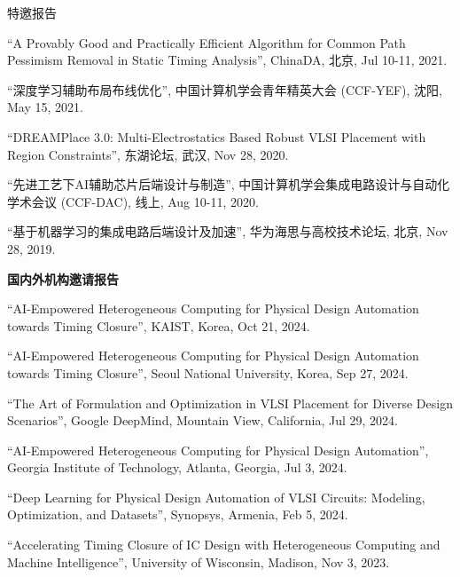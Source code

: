 \begin{rSection}{特邀报告}
\begin{description}[font=\normalfont]
\item[{[5]}]{
``A Provably Good and Practically Efficient Algorithm for Common Path Pessimism Removal in Static Timing Analysis'', ChinaDA, 北京, Jul 10-11, 2021. 
}

\item[{[4]}]{
``深度学习辅助布局布线优化'', 中国计算机学会青年精英大会 (CCF-YEF), 沈阳, May 15, 2021. 
}

\item[{[3]}]{
``DREAMPlace 3.0: Multi-Electrostatics Based Robust VLSI Placement with Region Constraints'', 东湖论坛, 武汉, Nov 28, 2020.
}

\item[{[2]}]{
``先进工艺下AI辅助芯片后端设计与制造'', 中国计算机学会集成电路设计与自动化学术会议 (CCF-DAC), 线上, Aug 10-11, 2020. 
}

\item[{[1]}]{
``基于机器学习的集成电路后端设计及加速'', 华为海思与高校技术论坛, 北京, Nov 28, 2019. 
}

\end{description}

\textbf{国内外机构邀请报告}
        
\begin{description}[font=\normalfont]

\item[{[13]}]{
``AI-Empowered Heterogeneous Computing for Physical Design Automation towards Timing Closure'', KAIST, Korea, Oct 21, 2024. 
}

\item[{[12]}]{
``AI-Empowered Heterogeneous Computing for Physical Design Automation towards Timing Closure'', Seoul National University, Korea, Sep 27, 2024. 
}

\item[{[11]}]{
``The Art of Formulation and Optimization in VLSI Placement for Diverse Design Scenarios'', Google DeepMind, Mountain View, California, Jul 29, 2024. 
}

\item[{[10]}]{
``AI-Empowered Heterogeneous Computing for Physical Design Automation'', Georgia Institute of Technology, Atlanta, Georgia, Jul 3, 2024. 
}

\item[{[9]}]{
``Deep Learning for Physical Design Automation of VLSI Circuits: Modeling, Optimization, and Datasets'', Synopsys, Armenia, Feb 5, 2024. 
}

\item[{[8]}]{
``Accelerating Timing Closure of IC Design with Heterogeneous Computing and Machine Intelligence'', University of Wisconsin, Madison, Nov 3, 2023. 
}


\end{description}
\end{rSection}
